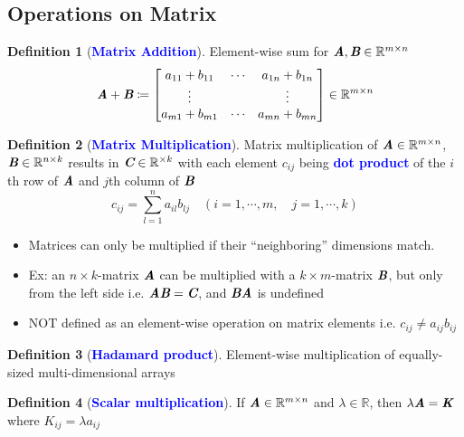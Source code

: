 \documentclass[12pt]{article}
\theoremstyle{definition}
\newtheorem{definition}{Definition}[section]
\newcommand{\subkeyword}[1]{\textbf{\textcolor{blue}{#1}}}
\newcommand{\mat}[1]{\textit{\textbf{#1}}}
\newcommand{\rspace}[2]{\mathbb{R}^{#1 \times #2}}
\begin{document}
        \subsection{Operations on Matrix}
            \begin{definition}[\subkeyword{Matrix Addition}]
                Element-wise sum for $\mat{A}, \mat{B} \in \rspace{m}{n}$
                \begin{equation*}
                    \mat{A} + \mat{B} \coloneqq \left[
                        \begin{matrix}
                            a_{11} + b_{11} & \cdots & a_{1n} + b_{1n}\\
                            \vdots          &        & \vdots         \\
                            a_{m1} + b_{m1} & \cdots & a_{mn} + b_{mn}\\
                        \end{matrix}
                    \right] \in \rspace{m}{n}
                \end{equation*}
            \end{definition}
            \begin{definition}[\subkeyword{Matrix Multiplication}]
                Matrix multiplication of $\mat{A} \in \rspace{m}{n}$, 
                $\mat{B} \in \mathbb{R}^{n\times k}$ results in $\mat{C}\in 
                \mathbb{R}^{\times k}$ with each element $c_{ij}$ being 
                \subkeyword{dot product} of the $i$th row of $\mat{A}$ and $j$th 
                column of $\mat{B}$
                \begin{equation*}
                    c_{ij} = \sum_{l = 1}^{n}a_{il}b_{lj} \quad 
                    (i=1,\cdots,m, \quad j=1,\cdots,k)
                \end{equation*}
                \begin{itemize}
                    \item Matrices can only be multiplied if their 
                        “neighboring” dimensions match. 
                    \item Ex: an $n\times k$-matrix $\mat{A}$ can be 
                        multiplied with a $k\times m$-matrix $\mat{B}$, 
                        but only from the left side i.e. 
                        $\mat{A}\mat{B} = \mat{C}$, and $\mat{B}\mat{A}$ is
                        undefined
                    \item NOT defined as an element-wise operation on matrix
                        elements i.e. $c_{ij} \neq a_{ij}b_{ij}$
                \end{itemize}
            \end{definition}
            \begin{definition}[\subkeyword{Hadamard product}]
                Element-wise multiplication of equally-sized multi-dimensional arrays
            \end{definition}
            \begin{definition}[\subkeyword{Scalar multiplication}]
                If $\mat{A}\in\rspace{m}{n}$ and $\lambda \in \mathbb{R}$, then 
                $\lambda \mat{A}=\mat{K}$ where $K_{ij} = \lambda a_{ij}$
            \end{definition}
\end{document}
